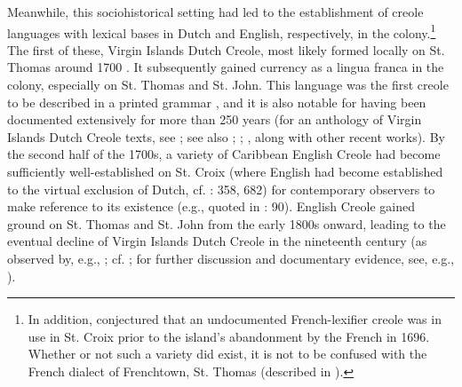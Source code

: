 \documentclass[output=paper,colorlinks,citecolor=brown]{langscibook}
\begin{document}
Meanwhile, this sociohistorical setting had led to the establishment of creole languages with lexical bases in Dutch and English, respectively, in the colony.\footnote{In addition, \citet[131–32]{Highfield_1993} conjectured that an undocumented French-lexifier creole was in use in St. Croix prior to the island’s abandonment by the French in 1696. Whether or not such a variety did exist, it is not to be confused with the French dialect of Frenchtown, St. Thomas (described in \cite{Highfield_1979}).} The first of these, Virgin Islands Dutch Creole, most likely formed locally on St. Thomas around 1700 \citep[cf.][52--54]{Sabino_2012}. It subsequently gained currency as a lingua franca in the colony, especially on St. Thomas and St. John. This language was the first creole to be described in a printed grammar \citep[see][]{Magens_1770}, and it is also notable for having been documented extensively for more than 250 years (for an anthology of Virgin Islands Dutch Creole texts, see \cite{vanRosseman_van_der_Voort_1996}; see also \cite{vanRosseman_2017}; \cite{vanSluijs_2017}; \cite{Boegh_2022}, along with other recent works). By the second half of the 1700s, a variety of Caribbean English Creole had become sufficiently well-established on St. Croix (where English had become established to the virtual exclusion of Dutch, cf. \cite{Oldendorp_2000}: 358, 682) for contemporary observers to make reference to its existence (e.g., \cite{Auerbach_1774} quoted in \cite{vanRosseman_2017}: 90). English Creole gained ground on St. Thomas and St. John from the early 1800s onward, leading to the eventual decline of Virgin Islands Dutch Creole in the nineteenth century (as observed by, e.g., \cite{Pontoppidan_1881}; cf. \cite{Stein_2014}; for further discussion and documentary evidence, see, e.g., \cite{BoeghBakker_2021}).
\end{document}
